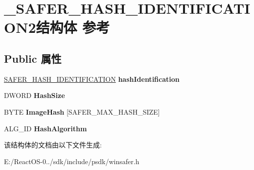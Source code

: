 \hypertarget{struct___s_a_f_e_r___h_a_s_h___i_d_e_n_t_i_f_i_c_a_t_i_o_n2}{}\section{\+\_\+\+S\+A\+F\+E\+R\+\_\+\+H\+A\+S\+H\+\_\+\+I\+D\+E\+N\+T\+I\+F\+I\+C\+A\+T\+I\+O\+N2结构体 参考}
\label{struct___s_a_f_e_r___h_a_s_h___i_d_e_n_t_i_f_i_c_a_t_i_o_n2}
\subsection*{Public 属性}
\begin{DoxyCompactItemize}
\item 
\mbox{\label{struct___s_a_f_e_r___h_a_s_h___i_d_e_n_t_i_f_i_c_a_t_i_o_n2_a4b6c9967607a68f3c018daab5fc715e0}} 
\hyperlink{struct___s_a_f_e_r___h_a_s_h___i_d_e_n_t_i_f_i_c_a_t_i_o_n}{S\+A\+F\+E\+R\+\_\+\+H\+A\+S\+H\+\_\+\+I\+D\+E\+N\+T\+I\+F\+I\+C\+A\+T\+I\+ON} {\bfseries hash\+Identification}
\item 
\mbox{\label{struct___s_a_f_e_r___h_a_s_h___i_d_e_n_t_i_f_i_c_a_t_i_o_n2_ae87d67d5656f632aaadac870a60b3eb5}} 
D\+W\+O\+RD {\bfseries Hash\+Size}
\item 
\mbox{\label{struct___s_a_f_e_r___h_a_s_h___i_d_e_n_t_i_f_i_c_a_t_i_o_n2_a961920c8b6bf60b88de3c5b83fda4fc0}} 
B\+Y\+TE {\bfseries Image\+Hash} \mbox{[}S\+A\+F\+E\+R\+\_\+\+M\+A\+X\+\_\+\+H\+A\+S\+H\+\_\+\+S\+I\+ZE\mbox{]}
\item 
\mbox{\label{struct___s_a_f_e_r___h_a_s_h___i_d_e_n_t_i_f_i_c_a_t_i_o_n2_ac8bfd98164f6954c70576838cc2279a0}} 
A\+L\+G\+\_\+\+ID {\bfseries Hash\+Algorithm}
\end{DoxyCompactItemize}


该结构体的文档由以下文件生成\+:\begin{DoxyCompactItemize}
\item 
E\+:/\+React\+O\+S-\/0../sdk/include/psdk/winsafer.\+h\end{DoxyCompactItemize}
